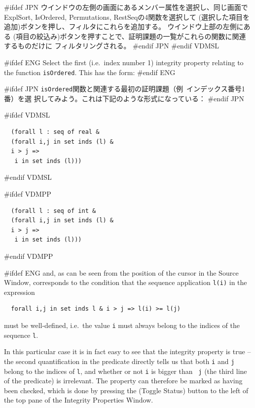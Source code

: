 \documentclass[\pformat,12pt]{article}
\newcommand{\aaa}{\tt }
\newcommand{\guicmd}[1]{{\sf #1}}
\newcommand{\guicmd}[1]{{\gt #1}}
\begin{document}
#ifdef JPN
ウインドウの左側の画面にある\guicmd{メンバー}属性を選択し、同じ画面で\guicmd{ExplSort}, 
\guicmd{IsOrdered}, \guicmd{Permutations}, \guicmd{RestSeq}の4関数を選択して
(\guicmd{選択した項目を追加})ボタンを押し、フィルタにこれらを追加する。
ウインドウ上部の左側にある  
(\guicmd{項目の絞込み})ボタンを押すことで、証明課題の一覧がこれらの関数に関連するものだけに
フィルタリングされる。
#endif JPN
#endif VDMSL

#ifdef ENG
Select the first (i.e.\ index number 1) integrity property relating to
the function {\aaa isOrdered}. This has the form:
#endif ENG

#ifdef JPN
{\aaa isOrdered}関数と関連する最初の証明課題（例\ インデックス番号1番）を選
択してみよう。これは下記のような形式になっている：
#endif JPN

#ifdef VDMSL
\begin{verbatim}
  (forall l : seq of real &
  (forall i,j in set inds (l) &
  i > j =>
   i in set inds (l)))
\end{verbatim}
#endif VDMSL

#ifdef VDMPP
\begin{verbatim}
  (forall l : seq of int &
  (forall i,j in set inds (l) &
  i > j =>
   i in set inds (l)))
\end{verbatim}
#endif VDMPP

#ifdef ENG
and, as can be seen from the position of the cursor in the
\guicmd{Source Window}, corresponds to the condition that the sequence
application \verb+l(i)+ in the expression

\begin{verbatim}
  forall i,j in set inds l & i > j => l(i) >= l(j)
\end{verbatim}

must be well-defined, i.e.\ the value {\aaa i} must always belong to the
indices of the sequence {\aaa l}.

In this particular case it is in fact easy to see that the integrity
property is true -- the second quantification in the predicate
directly tells us that both {\aaa i} and {\aaa j} belong to the
indices of {\aaa l}, and whether or not {\aaa i} is bigger than {\aaa
  j} (the third line of the predicate) is irrelevant. The property can
therefore be marked as having been checked, which is done by pressing
the
(\guicmd{Toggle Status}) button to the left of the top pane of the
\guicmd{Integrity Properties Window}.
\end{document}
